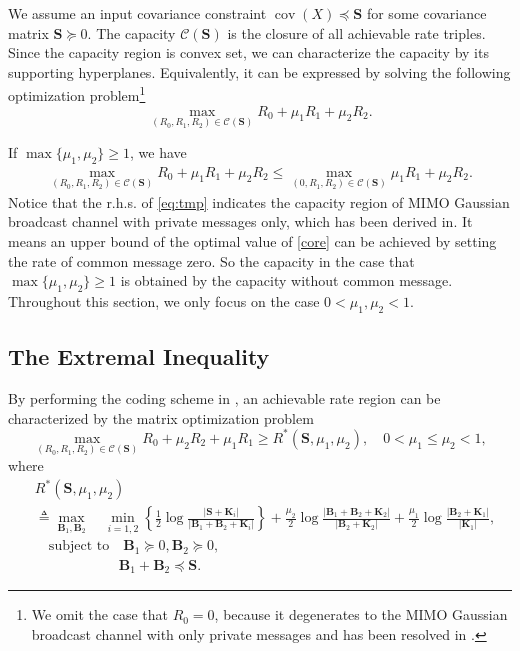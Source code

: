 \documentclass[journal,final, onecolumn]{IEEEtran}
\DeclareMathOperator{\cov}{cov}
\begin{document}
We assume an input covariance constraint  $ \cov(X) \preceq \boldsymbol{S} $ for some covariance matrix $\boldsymbol{S} \succeq 0 $. The capacity $\mathcal{C}(\boldsymbol{S})$ is the closure of all achievable rate triples. Since the capacity region is convex set, we can characterize the capacity by its supporting hyperplanes. Equivalently, it can be expressed by solving the following optimization problem\footnote{We omit the case that $R_{0}=0$, because it degenerates to the MIMO Gaussian broadcast channel with only private messages and has been resolved in \cite{WSS06,LV07}.}
\begin{equation} \label{core}
\max_{(R_{0},R_{1}, R_{2}) \in \mathcal{C}(\boldsymbol{S})} R_{0} + \mu_{1}R_{1} + \mu_{2}R_{2}.
\end{equation}

If $\max \{\mu_{1}, \mu_{2}\} \geq 1$, we have
\begin{align}
 \max_{(R_{0},R_{1}, R_{2}) \in\mathcal{C}(\boldsymbol{S})} R_{0} + \mu_{1}R_{1} + \mu_{2}R_{2}
\leq  \max_{(0 ,R_{1},R_{2}) \in \mathcal{C}(\boldsymbol{S})}  \mu_{1}R_{1} + \mu_{2}R_{2}. \label{eq:tmp}
\end{align}
Notice that the r.h.s. of \eqref{eq:tmp} indicates the capacity region of MIMO Gaussian broadcast channel with private messages only, which has been derived in\cite{WSS06,LV07}. It means an upper bound of the optimal value of \eqref{core} can be achieved by setting the rate of common message zero. So the capacity in the case that $\max \{\mu_{1}, \mu_{2} \} \geq 1$ is obtained by the capacity without common message. Throughout this section, we only focus on the case $0 < \mu_{1}, \mu_{2} < 1$.

\subsection{The Extremal Inequality}
By performing the coding scheme in \cite{JG04,WSS06-2,EU12,GN14}, an achievable rate region can be characterized by the matrix optimization problem
\begin{equation}
\max_{(R_{0},R_{1}, R_{2}) \in \mathcal{C}(\mathbf{S})} R_{0} + \mu_{2}R_{2} + \mu_{1} R_{1} \geq R^{*}(\boldsymbol{S}, \mu_1, \mu_2),  \quad 0 < \mu_{1} \leq \mu_{2}  < 1,
\end{equation}
where
\begin{align}
 & R^{*}(\boldsymbol{S}, \mu_1, \mu_2)\nonumber\\
 & \triangleq  \max_{\boldsymbol{B}_{1}, \boldsymbol{B}_{2}} \quad  \min_{i=1,2} \left\{ \frac{1}{2} \log \frac{|\boldsymbol{S}+ \boldsymbol{K}_{i}|}{|\boldsymbol{B}_{1} + \boldsymbol{B}_{2}+ \boldsymbol{K}_{i}|}\right\}
 +  \frac{\mu_{2}}{2} \log \frac{|\boldsymbol{B}_{1}  + \boldsymbol{B}_{2} + \boldsymbol{K}_{2}|}{|\boldsymbol{B}_{2} + \boldsymbol{K}_{2}|}
 + \frac{\mu_{1}}{2} \log \frac{|\boldsymbol{B}_{2}+\boldsymbol{K}_{1}|}{|\boldsymbol{K}_{1}|} ,\nonumber \\
& \quad\text{subject to} \quad  \boldsymbol{B}_{1} \succeq 0, \boldsymbol{B}_{2} \succeq 0, \nonumber\\
& \qquad\qquad \qquad   \boldsymbol{B}_{1}+\boldsymbol{B}_{2} \preceq \boldsymbol{S}.\label{optimal}
\end{align}
\end{document}
